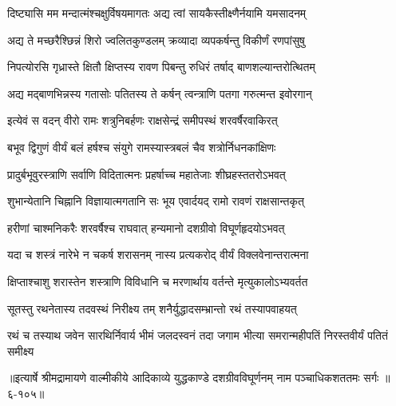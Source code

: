 \twolineshloka
{दिष्ट्यासि मम मन्दात्मंश्चक्षुर्विषयमागतः}
{अद्य त्वां सायकैस्तीक्ष्णैर्नयामि यमसादनम्} %

\twolineshloka
{अद्य ते मच्छरैश्छिन्नं शिरो ज्वलितकुण्डलम्}
{क्रव्यादा व्यपकर्षन्तु विकीर्णं रणपांसुषु} %

\twolineshloka
{निपत्योरसि गृध्रास्ते क्षितौ क्षिप्तस्य रावण}
{पिबन्तु रुधिरं तर्षाद् बाणशल्यान्तरोत्थितम्} %

\twolineshloka
{अद्य मद्बाणभिन्नस्य गतासोः पतितस्य ते}
{कर्षन् त्वन्त्राणि पतगा गरुत्मन्त इवोरगान्} %

\twolineshloka
{इत्येवं स वदन् वीरो रामः शत्रुनिबर्हणः}
{राक्षसेन्द्रं समीपस्थं शरवर्षैरवाकिरत्} %

\twolineshloka
{बभूव द्विगुणं वीर्यं बलं हर्षश्च संयुगे}
{रामस्यास्त्रबलं चैव शत्रोर्निधनकांक्षिणः} %

\twolineshloka
{प्रादुर्बभूवुरस्त्राणि सर्वाणि विदितात्मनः}
{प्रहर्षाच्च महातेजाः शीघ्रहस्ततरोऽभवत्} %

\twolineshloka
{शुभान्येतानि चिह्नानि विज्ञायात्मगतानि सः}
{भूय एवार्दयद् रामो रावणं राक्षसान्तकृत्} %

\twolineshloka
{हरीणां चाश्मनिकरैः शरवर्षैश्च राघवात्}
{हन्यमानो दशग्रीवो विघूर्णहृदयोऽभवत्} %

\twolineshloka
{यदा च शस्त्रं नारेभे न चकर्ष शरासनम्}
{नास्य प्रत्यकरोद् वीर्यं विक्लवेनान्तरात्मना} %

\twolineshloka
{क्षिप्ताश्चाशु शरास्तेन शस्त्राणि विविधानि च}
{मरणार्थाय वर्तन्ते मृत्युकालोऽभ्यवर्तत} %

\twolineshloka
{सूतस्तु रथनेतास्य तदवस्थं निरीक्ष्य तम्}
{शनैर्युद्धादसम्भ्रान्तो रथं तस्यापवाहयत्} %

\twolineshloka
{रथं च तस्याथ जवेन सारथिर्निवार्य भीमं जलदस्वनं तदा}
{जगाम भीत्या समरान्महीपतिं निरस्तवीर्यं पतितं समीक्ष्य} %


॥इत्यार्षे श्रीमद्रामायणे वाल्मीकीये आदिकाव्ये युद्धकाण्डे दशग्रीवविघूर्णनम् नाम पञ्चाधिकशततमः सर्गः ॥६-१०५॥
